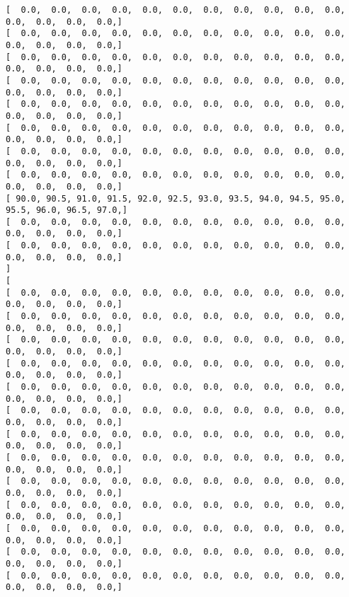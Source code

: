\documentclass[11pt]{article}
\begin{document}
\begin{Verbatim}[commandchars=\\\{\}]
[   0.0,   0.0,   0.0,   0.0,   0.0,   0.0,   0.0,   0.0,   0.0,   0.0,   0.0,   0.0,   0.0,   0.0,   0.0, ]
[   0.0,   0.0,   0.0,   0.0,   0.0,   0.0,   0.0,   0.0,   0.0,   0.0,   0.0,   0.0,   0.0,   0.0,   0.0, ]
[   0.0,   0.0,   0.0,   0.0,   0.0,   0.0,   0.0,   0.0,   0.0,   0.0,   0.0,   0.0,   0.0,   0.0,   0.0, ]
[   0.0,   0.0,   0.0,   0.0,   0.0,   0.0,   0.0,   0.0,   0.0,   0.0,   0.0,   0.0,   0.0,   0.0,   0.0, ]
[   0.0,   0.0,   0.0,   0.0,   0.0,   0.0,   0.0,   0.0,   0.0,   0.0,   0.0,   0.0,   0.0,   0.0,   0.0, ]
[   0.0,   0.0,   0.0,   0.0,   0.0,   0.0,   0.0,   0.0,   0.0,   0.0,   0.0,   0.0,   0.0,   0.0,   0.0, ]
[   0.0,   0.0,   0.0,   0.0,   0.0,   0.0,   0.0,   0.0,   0.0,   0.0,   0.0,   0.0,   0.0,   0.0,   0.0, ]
[   0.0,   0.0,   0.0,   0.0,   0.0,   0.0,   0.0,   0.0,   0.0,   0.0,   0.0,   0.0,   0.0,   0.0,   0.0, ]
[  90.0,  90.5,  91.0,  91.5,  92.0,  92.5,  93.0,  93.5,  94.0,  94.5,  95.0,  95.5,  96.0,  96.5,  97.0, ]
[   0.0,   0.0,   0.0,   0.0,   0.0,   0.0,   0.0,   0.0,   0.0,   0.0,   0.0,   0.0,   0.0,   0.0,   0.0, ]
[   0.0,   0.0,   0.0,   0.0,   0.0,   0.0,   0.0,   0.0,   0.0,   0.0,   0.0,   0.0,   0.0,   0.0,   0.0, ]
]
[
[   0.0,   0.0,   0.0,   0.0,   0.0,   0.0,   0.0,   0.0,   0.0,   0.0,   0.0,   0.0,   0.0,   0.0,   0.0, ]
[   0.0,   0.0,   0.0,   0.0,   0.0,   0.0,   0.0,   0.0,   0.0,   0.0,   0.0,   0.0,   0.0,   0.0,   0.0, ]
[   0.0,   0.0,   0.0,   0.0,   0.0,   0.0,   0.0,   0.0,   0.0,   0.0,   0.0,   0.0,   0.0,   0.0,   0.0, ]
[   0.0,   0.0,   0.0,   0.0,   0.0,   0.0,   0.0,   0.0,   0.0,   0.0,   0.0,   0.0,   0.0,   0.0,   0.0, ]
[   0.0,   0.0,   0.0,   0.0,   0.0,   0.0,   0.0,   0.0,   0.0,   0.0,   0.0,   0.0,   0.0,   0.0,   0.0, ]
[   0.0,   0.0,   0.0,   0.0,   0.0,   0.0,   0.0,   0.0,   0.0,   0.0,   0.0,   0.0,   0.0,   0.0,   0.0, ]
[   0.0,   0.0,   0.0,   0.0,   0.0,   0.0,   0.0,   0.0,   0.0,   0.0,   0.0,   0.0,   0.0,   0.0,   0.0, ]
[   0.0,   0.0,   0.0,   0.0,   0.0,   0.0,   0.0,   0.0,   0.0,   0.0,   0.0,   0.0,   0.0,   0.0,   0.0, ]
[   0.0,   0.0,   0.0,   0.0,   0.0,   0.0,   0.0,   0.0,   0.0,   0.0,   0.0,   0.0,   0.0,   0.0,   0.0, ]
[   0.0,   0.0,   0.0,   0.0,   0.0,   0.0,   0.0,   0.0,   0.0,   0.0,   0.0,   0.0,   0.0,   0.0,   0.0, ]
[   0.0,   0.0,   0.0,   0.0,   0.0,   0.0,   0.0,   0.0,   0.0,   0.0,   0.0,   0.0,   0.0,   0.0,   0.0, ]
[   0.0,   0.0,   0.0,   0.0,   0.0,   0.0,   0.0,   0.0,   0.0,   0.0,   0.0,   0.0,   0.0,   0.0,   0.0, ]
[   0.0,   0.0,   0.0,   0.0,   0.0,   0.0,   0.0,   0.0,   0.0,   0.0,   0.0,   0.0,   0.0,   0.0,   0.0, ]

\end{Verbatim}
\end{document}
